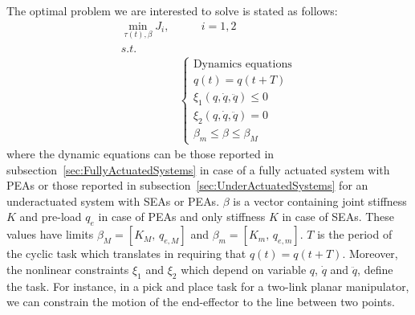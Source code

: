 The optimal problem we are interested to solve is stated as follows: 
\begin{equation} 
\begin{aligned}
\min_{\tau(t), \beta}{J_i},&\qquad i=1,2\\
s.t. & \\
& \begin{cases}  
  \text{Dynamics equations} \\
  q(t)=q(t+T)  \\
  \xi_1(q,\dot q,\ddot q)\leq 0 \\
  \xi_2(q,\dot q,\ddot q) = 0 \\
  \beta_m\leq \beta \leq \beta_M 
\label{eq:problem_form}
\end{cases}
\end{aligned}
\end{equation}
where the dynamic equations can be those reported in subsection~\ref{sec:FullyActuatedSystems} in case of a fully actuated system with PEAs or those reported in subsection~\ref{sec:UnderActuatedSystems} for an underactuated system with SEAs or PEAs. $\beta$ is a vector containing joint stiffness $K$ and pre-load $q_e$ in case of PEAs and only stiffness $K$ in case of SEAs. These values have limits $\beta_M=[K_M,\,q_{e,M}]$ and $\beta_m=[K_m,\,q_{e,m}]$. $T$ is the period of the cyclic task which translates in requiring that $q(t)=q(t+T)$. Moreover, the nonlinear constraints $\xi_1$ and $\xi_2$ which depend on variable $q$, $\dot q$ and $\ddot q$, define the task. For instance, in a pick and place task for a two-link planar manipulator, we can constrain the motion of the end-effector to the line between two points. 




